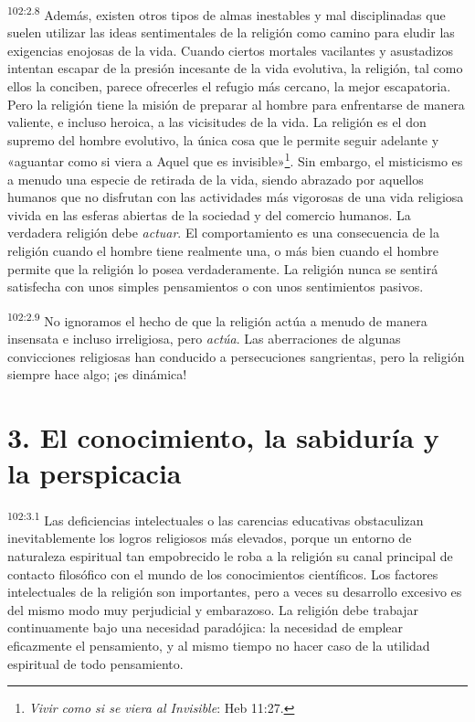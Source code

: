 \par
\textsuperscript{102:2.8} Además, existen otros tipos de almas inestables y mal disciplinadas que suelen utilizar las ideas sentimentales de la religión como camino para eludir las exigencias enojosas de la vida. Cuando ciertos mortales vacilantes y asustadizos intentan escapar de la presión incesante de la vida evolutiva, la religión, tal como ellos la conciben, parece ofrecerles el refugio más cercano, la mejor escapatoria. Pero la religión tiene la misión de preparar al hombre para enfrentarse de manera valiente, e incluso heroica, a las vicisitudes de la vida. La religión es el don supremo del hombre evolutivo, la única cosa que le permite seguir adelante y «aguantar como si viera a Aquel que es invisible»\footnote{\textit{Vivir como si se viera al Invisible}: Heb 11:27.}. Sin embargo, el misticismo es a menudo una especie de retirada de la vida, siendo abrazado por aquellos humanos que no disfrutan con las actividades más vigorosas de una vida religiosa vivida en las esferas abiertas de la sociedad y del comercio humanos. La verdadera religión debe \textit{actuar}. El comportamiento es una consecuencia de la religión cuando el hombre tiene realmente una, o más bien cuando el hombre permite que la religión lo posea verdaderamente. La religión nunca se sentirá satisfecha con unos simples pensamientos o con unos sentimientos pasivos.

\par
\textsuperscript{102:2.9} No ignoramos el hecho de que la religión actúa a menudo de manera insensata e incluso irreligiosa, pero \textit{actúa}. Las aberraciones de algunas convicciones religiosas han conducido a persecuciones sangrientas, pero la religión siempre hace algo; ¡es dinámica!

\section*{3. El conocimiento, la sabiduría y la perspicacia}
\par
\textsuperscript{102:3.1} Las deficiencias intelectuales o las carencias educativas obstaculizan inevitablemente los logros religiosos más elevados, porque un entorno de naturaleza espiritual tan empobrecido le roba a la religión su canal principal de contacto filosófico con el mundo de los conocimientos científicos. Los factores intelectuales de la religión son importantes, pero a veces su desarrollo excesivo es del mismo modo muy perjudicial y embarazoso. La religión debe trabajar continuamente bajo una necesidad paradójica: la necesidad de emplear eficazmente el pensamiento, y al mismo tiempo no hacer caso de la utilidad espiritual de todo pensamiento.

